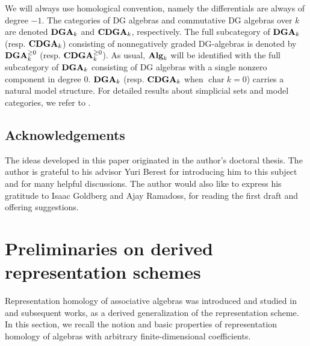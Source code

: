 \documentclass{article}
\numberwithin{equation}{section} %
\theoremstyle{plain}
\theoremstyle{definition}
\theoremstyle{remark}
\begin{document}
We will always use homological convention, namely the differentials are always of degree $-1$.
The categories of DG algebras and commutative DG algebras over $k$ are denoted ${\bf DGA}_k$ and ${\bf CDGA}_k$, respectively.
The full subcategory of ${\bf DGA}_k$ (resp. ${\bf CDGA}_k$) consisting of nonnegatively graded DG-algebras is denoted by ${\bf DGA}_k^{\geq0}$ (resp. ${\bf CDGA}_k^{\geq0}$).
As usual, ${\bf Alg}_k$ will be identified with the full subcategory of ${\bf DGA}_k$ consisting of DG algebras with a single nonzero component in degree $0$.
${\bf DGA}_k$ (resp. ${\bf CDGA}_k$ when $\operatorname{char}k=0$) carries a natural model structure.
For detailed results about simplicial sets and model categories, we refer to \cite{BKR13,H03,Q67}.

\subsection{Acknowledgements}

The ideas developed in this paper originated in the author's doctoral thesis.
The author is grateful to his advisor Yuri Berest for introducing him to this subject and for many helpful discussions.
The author would also like to express his gratitude to Isaac Goldberg and Ajay Ramadoss, for reading the first draft and offering suggestions.

\section{Preliminaries on derived representation schemes}\label{Sec_Pre}

Representation homology of associative algebras was introduced and studied in \cite{BFPRW17,BFR14,BKR13,BR16} and subsequent works, as a derived generalization of the representation scheme.
In this section, we recall the notion and basic properties of representation homology of algebras with arbitrary finite-dimensional coefficients.
\end{document}
